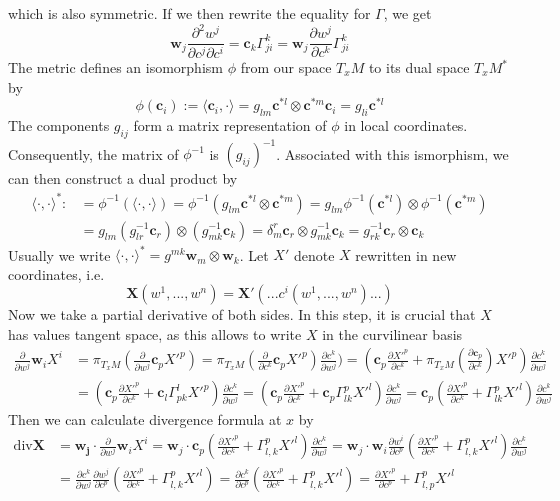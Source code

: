 which is also symmetric. If we then rewrite the equality for $\Gamma$, we get
\[\mathbf{w}_j\frac{\partial^2 w^j}{\partial c^j\partial c^i}=\mathbf{c}_k\Gamma_{ji}^k
=\mathbf{w}_j\frac{\partial w^j}{\partial c^k}\Gamma_{ji}^k\]
The metric defines an isomorphism $\phi$ from our space $T_xM$ to its dual space $T_xM^*$ by
\[\phi(\mathbf{c}_i):=\langle\mathbf{c}_i,\cdot\rangle=g_{lm}\mathbf{c}^{*l}\otimes\mathbf{c}^{*m}\mathbf{c}_i=g_{li}\mathbf{c}^{*l}\]
The components $g_{ij}$ form a matrix representation of $\phi$ in local coordinates.
Consequently, the matrix of $\phi^{-1}$ is $(g_{ij})^{-1}$. Associated with this
ismorphism, we can then construct a dual product by
\begin{align*}
    \langle\cdot,\cdot\rangle^*:&=\phi^{-1}(\langle\cdot,\cdot\rangle)=\phi^{-1}(g_{lm}\mathbf{c}^{*l}\otimes\mathbf{c}^{*m})
=g_{lm}\phi^{-1}(\mathbf{c}^{*l})\otimes\phi^{-1}(\mathbf{c}^{*m})\\
    &=g_{lm}(g^{-1}_{lr}\mathbf{c}_r)\otimes(g^{-1}_{mk}\mathbf{c}_k)
    =\delta_m^r\mathbf{c}_r\otimes g^{-1}_{mk}\mathbf{c}_k=g^{-1}_{rk}\mathbf{c}_r\otimes \mathbf{c}_k
\end{align*}
Usually we  write $\langle\cdot,\cdot\rangle^*=g^{mk}\mathbf{w}_m\otimes \mathbf{w}_k$.
Let $X'$ denote $X$ rewritten in new coordinates, i.e.
\[\mathbf{X}(w^1,...,w^n)=\mathbf{X}'(...c^i(w^1,...,w^n)...)\]
Now we take a partial derivative of both sides. In this step, it is
crucial that $X$ has values tangent space, as this allows to write $X$ in the
curvilinear basis
\begin{align*}
\frac{\partial}{\partial w^j}\mathbf{w}_iX^i&
=\pi_{T_x M}(\frac{\partial}{\partial w^j}\mathbf{c}_pX'^p)
=\pi_{T_x M}(\frac{\partial}{\partial c^k}\mathbf{c}_pX'^p)\frac{\partial c^k}{\partial w^j})
    =(\mathbf{c}_p\frac{\partial X'^p}{\partial c^k}+\pi_{T_x M}(\frac{\partial\mathbf{c}_p}{\partial c^k})X'^p)\frac{\partial c^k}{\partial w^j}\\
&=(\mathbf{c}_p\frac{\partial X'^p}{\partial c^k}+\mathbf{c}_l\Gamma^l_{pk}X'^p)\frac{\partial c^k}{\partial w^j}
=(\mathbf{c}_p\frac{\partial X'^p}{\partial c^k}+\mathbf{c}_p\Gamma^p_{lk}X'^l)\frac{\partial c^k}{\partial w^j}
=\mathbf{c}_p(\frac{\partial X'^p}{\partial c^k}+\Gamma^p_{lk}X'^l)\frac{\partial c^k}{\partial w^j}
\end{align*}
Then we can calculate divergence formula at $x$ by
\begin{align*}
\text{div}\mathbf{X}&=\mathbf{w_j}\cdot\frac{\partial}{\partial w^j}\mathbf{w}_iX^i
=\mathbf{w}_j\cdot\mathbf{c}_p(\frac{\partial X'^p}{\partial c^k}+\Gamma^p_{l,k}X'^l)\frac{\partial c^k}{\partial w^j}
=\mathbf{w}_j\cdot\mathbf{w}_i\frac{\partial w^i}{\partial c^p}(\frac{\partial X'^p}{\partial c^k}+\Gamma^p_{l,k}X'^l)\frac{\partial c^k}{\partial w^j}\\
&=\frac{\partial c^k}{\partial w^j}\frac{\partial w^j}{\partial c^p}(\frac{\partial X'^p}{\partial c^k}+\Gamma^p_{l,k}X'^l)
=\frac{\partial c^k}{\partial c^p}(\frac{\partial X'^p}{\partial c^k}+\Gamma^p_{l,k}X'^l)
=\frac{\partial X'^p}{\partial c^p}+\Gamma^p_{l,p}X'^l
\end{align*}
